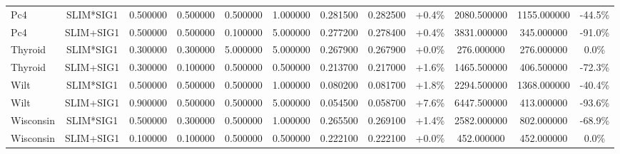 \begin{table}[H]
\begin{tabular}{lccccccccccc}
Pc4 & SLIM*SIG1 & 0.500000 & 0.500000 & 0.500000 & 1.000000 & 0.281500 & 0.282500 & +0.4\% & 2080.500000 & 1155.000000 & -44.5\% \\
Pc4 & SLIM+SIG1 & 0.500000 & 0.500000 & 0.100000 & 5.000000 & 0.277200 & 0.278400 & +0.4\% & 3831.000000 & 345.000000 & -91.0\% \\
Thyroid & SLIM*SIG1 & 0.300000 & 0.300000 & 5.000000 & 5.000000 & 0.267900 & 0.267900 & +0.0\% & 276.000000 & 276.000000 & 0.0\% \\
Thyroid & SLIM+SIG1 & 0.300000 & 0.100000 & 0.500000 & 0.500000 & 0.213700 & 0.217000 & +1.6\% & 1465.500000 & 406.500000 & -72.3\% \\
Wilt & SLIM*SIG1 & 0.500000 & 0.500000 & 0.500000 & 1.000000 & 0.080200 & 0.081700 & +1.8\% & 2294.500000 & 1368.000000 & -40.4\% \\
Wilt & SLIM+SIG1 & 0.900000 & 0.500000 & 0.500000 & 5.000000 & 0.054500 & 0.058700 & +7.6\% & 6447.500000 & 413.000000 & -93.6\% \\
Wisconsin & SLIM*SIG1 & 0.500000 & 0.300000 & 0.500000 & 1.000000 & 0.265500 & 0.269100 & +1.4\% & 2582.000000 & 802.000000 & -68.9\% \\
Wisconsin & SLIM+SIG1 & 0.100000 & 0.100000 & 0.500000 & 0.500000 & 0.222100 & 0.222100 & +0.0\% & 452.000000 & 452.000000 & 0.0\% \\
\bottomrule
\end{tabular}

        
    \end{table}
    